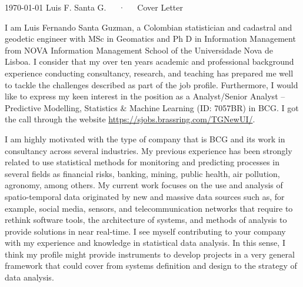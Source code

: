 \documentclass[11pt, a4paper]{awesome-cv}
\begin{document}
\makecvheader[R]

\makecvfooter
  {\today}
    {Luis F. Santa G.~~~·~~~Cover Letter}
  {}

\makelettertitle

\begin{cvletter}
I am Luis Fernando Santa Guzman, a Colombian statistician and cadastral and geodetic engineer with MSc in Geomatics and Ph D in Information Management from NOVA Information Management School of the Universidade Nova de Lisboa. I consider that my over ten years academic and professional background experience conducting consultancy, research, and teaching has prepared me well to tackle the challenges described as part of the job profile. Furthermore, I would like to express my keen interest in the position as a Analyst/Senior Analyst – Predictive Modelling, Statistics & Machine Learning (ID: 7057BR) in BCG. I got the call through the website \url{https://sjobs.brassring.com/TGNewUI/}.\par  
I am highly motivated with the type of company that is BCG and its work in consultancy across several industries. My previous experience has been strongly related to use statistical methods for monitoring and predicting processes in several fields as financial risks, banking, mining, public health, air pollution, agronomy, among others. My current work focuses on the use and analysis of spatio-temporal data originated by new and massive data sources such as, for example, social media, sensors, and telecommunication networks that require to rethink software tools, the architecture of systems, and methods of analysis to provide solutions in near real-time. I see myself contributing to your company with my experience and knowledge in statistical data analysis. In this sense, I think my profile might provide instruments to develop projects in a very general framework that could cover from 
systems definition and design to the strategy of data analysis.\par 

\end{cvletter}
\end{document}
